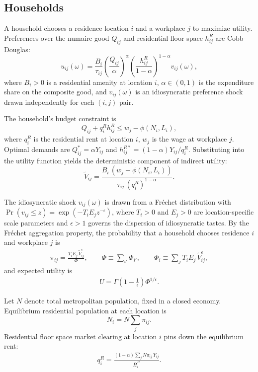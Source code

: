 \documentclass[12pt, a4paper]{article}
\theoremstyle{definition}
\begin{document}
\subsection{Households}

A household chooses a residence location $i$ and a workplace $j$ to maximize utility. Preferences over the numaire good $Q_{ij}$ and residential floor space $h_{ij}^R$ are Cobb-Douglas:
\[
u_{ij}(\omega) = \frac{B_i}{\tau_{ij}}
\left(\frac{Q_{ij}}{\alpha}\right)^{\!\alpha}
\left(\frac{h_{ij}^R}{1-\alpha}\right)^{\!1-\alpha}
v_{ij}(\omega),
\]
where $B_i > 0$ is a residential amenity at location $i$, $\alpha \in (0,1)$ is the expenditure share on the composite good, and $v_{ij}(\omega)$ is an idiosyncratic preference shock drawn independently for each $(i,j)$ pair.

The household's budget constraint is
\[
Q_{ij} + q_i^R h_{ij}^R \leq w_j-\phi(N_i, L_i),
\]
where $q_i^R$ is the residential rent at location $i$, $w_j$ is the wage at workplace $j$. Optimal demands are $Q_{ij}^* = \alpha Y_{ij}$ and $h_{ij}^{R*} = (1-\alpha)Y_{ij}/q_i^R$. Substituting into the utility function yields the deterministic component of indirect utility:
\[
\tilde{V}_{ij} = \frac{B_i\, (w_{j}-\phi(N_i, L_i))}{\tau_{ij}\,(q_i^R)^{1-\alpha}}.
\]

The idiosyncratic shock $v_{ij}(\omega)$ is drawn from a Fréchet distribution with $\Pr(v_{ij} \leq z) = \exp(-T_i E_j z^{-\epsilon})$, where $T_i > 0$ and $E_j > 0$ are location-specific scale parameters and $\epsilon > 1$ governs the dispersion of idiosyncratic tastes. By the Fréchet aggregation property, the probability that a household chooses residence $i$ and workplace $j$ is
\begin{align}
    \pi_{ij} = \frac{T_i E_j\,\tilde{V}_{ij}^{\epsilon}}{\Phi}, \qquad
    \Phi \equiv \sum_{i'}\Phi_{i'}, \qquad
    \Phi_i \equiv \sum_j T_i E_j\,\tilde{V}_{ij}^{\epsilon},
\end{align}
and expected utility is
\begin{align}
    U = \Gamma\!\left(1 - \tfrac{1}{\epsilon}\right)\Phi^{1/\epsilon}.
\end{align}

Let $N$ denote total metropolitan population, fixed in a closed economy. Equilibrium residential population at each location is
\[
N_i = N \sum_j \pi_{ij}.
\]
Residential floor space market clearing at location $i$ pins down the equilibrium rent:
\begin{align}
    \label{eq:rent-clearing}
    q_i^R = \frac{(1-\alpha)\sum_j N\pi_{ij}\,Y_{ij}}{\bar{H}_i^R}.
\end{align}
\end{document}
